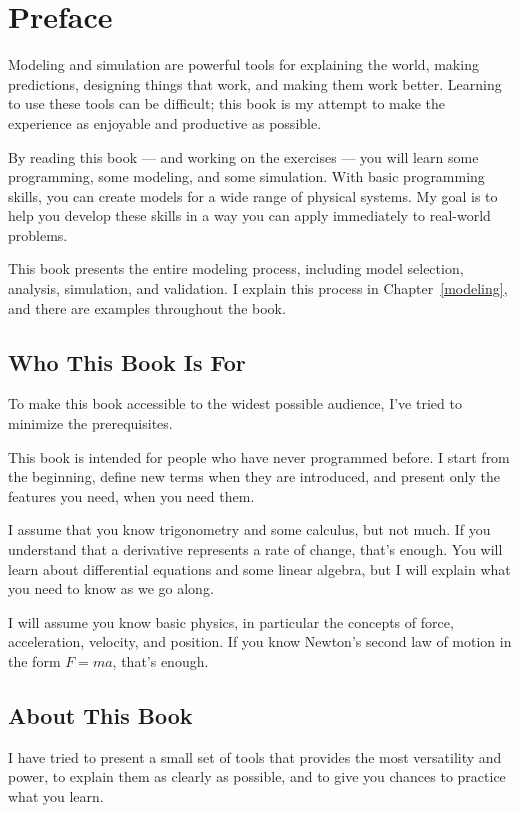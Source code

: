 \chapter*{Preface}
\adjustmtc

Modeling and simulation are powerful tools for explaining the world, making predictions, designing things that work, and making them work better.  Learning to use these tools can be difficult; this book is my attempt to make the experience as enjoyable and productive as possible.

By reading this book --- and working on the exercises --- you will learn some programming, some modeling, and some simulation.
With basic programming skills, you can create models for a wide range of physical systems.
My goal is to help you develop these skills in a way you can apply immediately to real-world problems.

This book presents the entire modeling process, including model selection, analysis, simulation, and validation.  I explain this process in Chapter~\ref{modeling}, and there are examples throughout the book.

\section{Who This Book Is For}

To make this book accessible to the widest possible audience, I've tried to minimize the prerequisites.  

This book is intended for people who have never programmed before.  I start from the beginning, define new terms when they are introduced, and present only the features you need, when you need them.

I assume that you know trigonometry and some calculus, but not much.  If you understand that a derivative represents a rate of change, that's enough.  You will learn about differential equations and some linear algebra, but I will explain what you need to know as we go along.

I will assume you know basic physics, in particular the concepts of force, acceleration, velocity, and position.  If you know Newton's second law of motion in the form $F = m a$, that's enough.

\section{About This Book}

I have tried to present a small set of tools that provides the most versatility and power, to explain them as clearly as possible, and to give you chances to practice what you learn.

